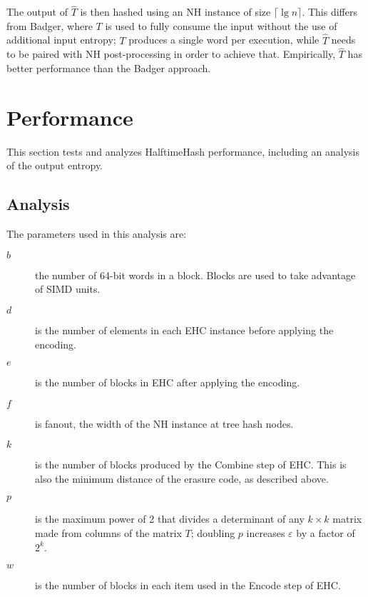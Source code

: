 \documentclass[runningheads]{llncs}
\begin{document}
The output of $\widehat{T}$ is then hashed using an NH instance of size $\lceil \lg n \rceil$.
This differs from Badger, where $T$ is used to fully consume the input without the use of additional input entropy;
$T$ produces a single word per execution, while $\widehat{T}$ needs to be paired with NH post-processing in order to achieve that.\cite{badger}
Empirically, $\widehat{T}$ has better performance than the Badger approach.

\section{Performance}
\label{performance}

This section tests and analyzes HalftimeHash performance, including an analysis of the output entropy.

\subsection{Analysis}
The parameters used in this analysis are:

\begin {description}
\item[$b$] the number of 64-bit words in a block.
  Blocks are used to take advantage of SIMD units.
\item[$d$] is the number of elements in each EHC instance before applying the encoding.
\item[$e$] is the number of blocks in EHC after applying the encoding.
\item[$f$] is fanout, the width of the NH instance at tree hash nodes.
\item[$k$] is the number of blocks produced by the Combine step of EHC.
  This is also the minimum distance of the erasure code, as described above.
\item[$p$] is the maximum power of 2 that divides a determinant of any $k \times k$ matrix made from columns of the matrix $T$; doubling $p$ increases $\varepsilon$ by a factor of $2^k$.
\item[$w$] is the number of blocks in each item used in the Encode step of EHC.
\end{description}
\end{document}
